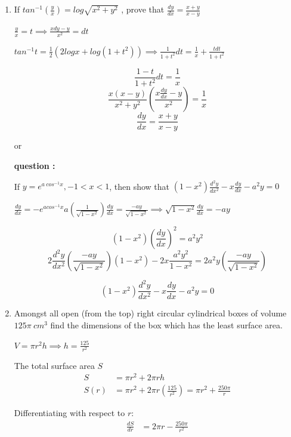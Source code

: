 \begin{enumerate}[label=\thesubsection.\arabic*, ref=\thesubsection.\theenumi]
\solution

$$dr_1 = (2,-1,2); dr_2= (2,-1,1)$$  $$dr=dr_1 \times {dr_2 } \implies (1,2,0)$$

$1(x-1) +2(y) =0 \implies x+2y=1$

\item 

If $tan^{-1}(\frac{y}{x})=log\sqrt{x^{2}+y^{2}}$ , prove that $\frac{dy}{dx}=\frac{x+y}{x-y}$

\solution

$\frac{y}{x}=t \implies \frac{xdy-y}{x^2} =dt$

$tan^{-1}t=\frac{1}{2}(2logx +log(1+t^2)) \implies \frac{1}{1+ t^2}dt= \frac{1}{x}+\frac{tdt}{1+t^2}$

$$\frac{1-t}{1+t^2}dt =\frac{1}{x}$$  $$\frac{x(x-y)}{x^2+y^2}\left(\frac{x\frac{dy}{dx}-y}{x^2}\right)=\frac{1}{x}$$ $$\frac{dy}{dx}= \frac{x+y}{x-y}$$

\begin{center}
    or 
\end{center}
\textbf{question :}

If $y=e^{a~cos^{-1}x},-1<x<1$, then show that $(1-x^{2})\frac{d^{2}y}{dx^{2}}-x\frac{dy}{dx}-a^{2}y=0$

\solution

$\frac{dy}{dx}=-e^{a cos^{-1}x}a(\frac{1}{\sqrt{1-x^2}}) $$\frac{dy}{dx}= \frac{-ay}{\sqrt{1-x^2}} \implies \sqrt{1-x^2}\frac{dy}{dx}= -ay$

$$(1-x^2)(\frac{dy}{dx})^2=a^2y^2$$  $$2\frac{d^2y}{dx^2}(\frac{-ay}{\sqrt{1-x^2}})(1-x^2)-2x\frac{a^2y^2}{1-x^2}= 2a^2y(\frac{-ay}{\sqrt{1-x^2}}) $$

$$(1-x^{2})\frac{d^{2}y}{dx^{2}}-x\frac{dy}{dx}-a^{2}y=0$$

\item 

Amongst all open (from the top) right circular cylindrical boxes of volume $125\pi~cm^{3}$ find the dimensions of the box which has the least surface area.  

\solution

$V=\pi r^2h \implies h= \frac{125}{r^2}$

The total surface area $S$
\begin{align*}
S &= \pi r^2 + 2\pi r h \\
S(r) &= \pi r^2 + 2\pi r \left(\frac{125}{r^2}\right) = \pi r^2 + \frac{250\pi}{r}
\end{align*}

Differentiating with respect to $r$:
\begin{align*}
\frac{dS}{dr} &= 2\pi r - \frac{250\pi}{r^2}
\end{align*}


\end{enumerate}
